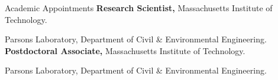 \begin{rubric}{Academic Appointments}
\entry*[2021 -- 2026]%
	\textbf{Research Scientist,} Massachusetts Institute of Technology.
    \par Parsons Laboratory, Department of Civil \& Environmental Engineering.
%
%
\entry*[2016 -- 2021]%
	\textbf{Postdoctoral Associate,} Massachusetts Institute of Technology.
    \par Parsons Laboratory, Department of Civil \& Environmental Engineering.
%
\end{rubric}